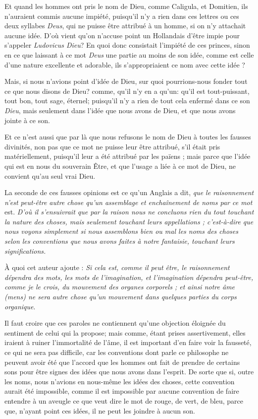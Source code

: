 Et quand les hommes ont pris le nom de Dieu, comme Caligula, et Domitien, ils n'auraient commis aucune impiété, puisqu'il n'y a rien dans ces lettres ou ces deux syllabes \emph{Deus}, qui ne puisse être attribué à un homme, si on n'y attachait aucune idée. D'où vient qu'on n'accuse point un Hollandais d'être impie pour s'appeler \emph{Ludovicus Dieu}? En quoi donc consistait l'impiété de ces princes, sinon en ce que laissant à ce mot \emph{Deus} une partie au moins de son idée, comme est celle d'une nature excellente et adorable, ils s'appropriaient ce nom avec cette idée ?

Mais, si nous n'avions point d'idée de Dieu, sur quoi pourrions-nous fonder tout ce que nous disons de Dieu? comme, qu'il n'y en a qu'un: qu'il est tout-puissant, tout bon, tout sage, éternel; puisqu'il n'y a rien de tout cela enfermé dans ce son \emph{Dieu}, mais seulement dans l'idée que nous avons de Dieu, et que nous avons jointe à ce son.

Et ce n'est aussi que par là que nous refusons le nom de Dieu à toutes les fausses divinités, non pas que ce mot ne puisse leur être attribué, s'il était pris matériellement, puisqu'il leur a été attribué par les païens ; mais parce que l'idée qui est en nous du souverain Être, et que l'usage a liée à ce mot de Dieu, ne convient qu'au seul vrai Dieu.

La seconde de ces fausses opinions est ce qu'un Anglais a dit, \emph{que le raisonnement n'est peut-être autre chose qu'un assemblage et enchaînement de noms par ce mot} est. \emph{D'où il s'ensuivrait que par la raison nous ne concluons rien du tout touchant la nature des choses, mais seulement touchant leurs appellations ; c'est-à-dire que nous voyons simplement si nous assemblons bien ou mal les noms des choses selon les conventions que nous avons faites à notre fantaisie, touchant leurs significations.}

À quoi cet auteur ajoute : \emph{Si cela est, comme il peut être, le raisonnement dépendra des mots, les mots de l'imagination, et l'imagination dépendra peut-être, comme je le crois, du mouvement des organes corporels ; et ainsi notre âme (mens) ne sera autre chose qu'un mouvement dans quelques parties du corps organique}.

Il faut croire que ces paroles ne contiennent qu'une objection éloignée du sentiment de celui qui la propose; mais comme, étant prises assertivement, elles iraient à ruiner l'immortalité de l'âme, il est important d'en faire voir la fausseté, ce qui ne sera pas difficile, car les conventions dont parle ce philosophe ne peuvent avoir été que l'accord que les hommes ont fait de prendre de certains sons pour être signes des idées que nous avons dans l'esprit. De sorte que si, outre les noms, nous n'avions en nous-même les idées des choses, cette convention aurait été impossible, comme il est impossible par aucune convention de faire entendre à un aveugle ce que veut dire le mot de rouge, de vert, de bleu, parce que, n'ayant point ces idées, il ne peut les joindre à aucun son.

